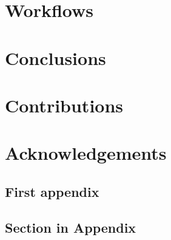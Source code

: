 \chapter{Workflows}



  

\chapter{Conclusions}



\chapter{Contributions}


\chapter{Acknowledgements}






\begin{uomappendix} 
  \chapter{First appendix}
    \section{Section in Appendix}
    \lipsum[1-6]
\end{uomappendix}



